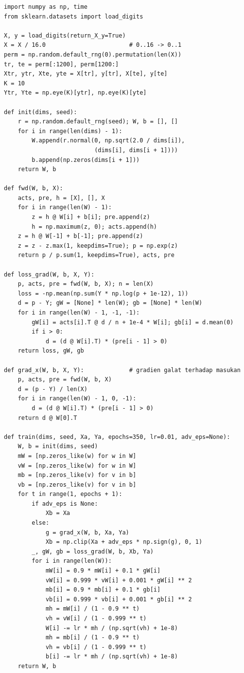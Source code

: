 \begin{lab}
\begin{verbatim}
import numpy as np, time
from sklearn.datasets import load_digits

X, y = load_digits(return_X_y=True)
X = X / 16.0                        # 0..16 -> 0..1
perm = np.random.default_rng(0).permutation(len(X))
tr, te = perm[:1200], perm[1200:]
Xtr, ytr, Xte, yte = X[tr], y[tr], X[te], y[te]
K = 10
Ytr, Yte = np.eye(K)[ytr], np.eye(K)[yte]

def init(dims, seed):
    r = np.random.default_rng(seed); W, b = [], []
    for i in range(len(dims) - 1):
        W.append(r.normal(0, np.sqrt(2.0 / dims[i]),
                          (dims[i], dims[i + 1])))
        b.append(np.zeros(dims[i + 1]))
    return W, b

def fwd(W, b, X):
    acts, pre, h = [X], [], X
    for i in range(len(W) - 1):
        z = h @ W[i] + b[i]; pre.append(z)
        h = np.maximum(z, 0); acts.append(h)
    z = h @ W[-1] + b[-1]; pre.append(z)
    z = z - z.max(1, keepdims=True); p = np.exp(z)
    return p / p.sum(1, keepdims=True), acts, pre

def loss_grad(W, b, X, Y):
    p, acts, pre = fwd(W, b, X); n = len(X)
    loss = -np.mean(np.sum(Y * np.log(p + 1e-12), 1))
    d = p - Y; gW = [None] * len(W); gb = [None] * len(W)
    for i in range(len(W) - 1, -1, -1):
        gW[i] = acts[i].T @ d / n + 1e-4 * W[i]; gb[i] = d.mean(0)
        if i > 0:
            d = (d @ W[i].T) * (pre[i - 1] > 0)
    return loss, gW, gb

def grad_x(W, b, X, Y):             # gradien galat terhadap masukan
    p, acts, pre = fwd(W, b, X)
    d = (p - Y) / len(X)
    for i in range(len(W) - 1, 0, -1):
        d = (d @ W[i].T) * (pre[i - 1] > 0)
    return d @ W[0].T

def train(dims, seed, Xa, Ya, epochs=350, lr=0.01, adv_eps=None):
    W, b = init(dims, seed)
    mW = [np.zeros_like(w) for w in W]
    vW = [np.zeros_like(w) for w in W]
    mb = [np.zeros_like(v) for v in b]
    vb = [np.zeros_like(v) for v in b]
    for t in range(1, epochs + 1):
        if adv_eps is None:
            Xb = Xa
        else:
            g = grad_x(W, b, Xa, Ya)
            Xb = np.clip(Xa + adv_eps * np.sign(g), 0, 1)
        _, gW, gb = loss_grad(W, b, Xb, Ya)
        for i in range(len(W)):
            mW[i] = 0.9 * mW[i] + 0.1 * gW[i]
            vW[i] = 0.999 * vW[i] + 0.001 * gW[i] ** 2
            mb[i] = 0.9 * mb[i] + 0.1 * gb[i]
            vb[i] = 0.999 * vb[i] + 0.001 * gb[i] ** 2
            mh = mW[i] / (1 - 0.9 ** t)
            vh = vW[i] / (1 - 0.999 ** t)
            W[i] -= lr * mh / (np.sqrt(vh) + 1e-8)
            mh = mb[i] / (1 - 0.9 ** t)
            vh = vb[i] / (1 - 0.999 ** t)
            b[i] -= lr * mh / (np.sqrt(vh) + 1e-8)
    return W, b


\end{verbatim}
\end{lab}
